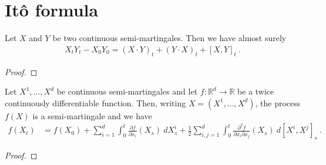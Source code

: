 \section{Itô formula}


\begin{theorem}\label{thm:integration_by_parts}
Let $X$ and $Y$ be two continuous semi-martingales. Then we have almost surely
\begin{align*}
  X_t Y_t - X_0 Y_0
  = (X \cdot Y)_t + (Y \cdot X)_t + [X,Y]_t
  \: .
\end{align*}
\end{theorem}

\begin{proof}

\end{proof}


\begin{theorem}\label{thm:Ito_formula}
Let $X^1, \ldots, X^d$ be continuous semi-martingales and let $f : \mathbb{R}^d \to \mathbb{R}$ be a twice continuously differentiable function.
Then, writing $X = (X^1, \ldots, X^d)$, the process $f(X)$ is a semi-martingale and we have
\begin{align*}
  f(X_t)
  &= f(X_0)
  + \sum_{i=1}^d \int_0^t \frac{\partial f}{\partial x_i}(X_s) \: dX^i_s
  + \frac{1}{2} \sum_{i,j=1}^d \int_0^t \frac{\partial^2 f}{\partial x_i \partial x_j}(X_s) \: d[X^i, X^j]_s
  \: .
\end{align*}
\end{theorem}

\begin{proof}

\end{proof}
